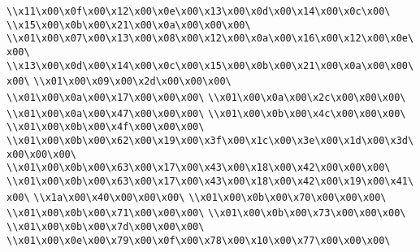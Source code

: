 \verb|\\x11\x00\x0f\x00\x12\x00\x0e\x00\x13\x00\x0d\x00\x14\x00\x0c\x00\|\newline
\verb|\\x15\x00\x0b\x00\x21\x00\x0a\x00\x00\x00\|\newline
\verb|\\x01\x00\x07\x00\x13\x00\x08\x00\x12\x00\x0a\x00\x16\x00\x12\x00\x0e\x00\|\newline
\verb|\\x13\x00\x0d\x00\x14\x00\x0c\x00\x15\x00\x0b\x00\x21\x00\x0a\x00\x00\x00\|\newline
\verb|\\x01\x00\x09\x00\x2d\x00\x00\x00\|\newline
\verb|\\x01\x00\x0a\x00\x17\x00\x00\x00\|\newline
\verb|\\x01\x00\x0a\x00\x2c\x00\x00\x00\|\newline
\verb|\\x01\x00\x0a\x00\x47\x00\x00\x00\|\newline
\verb|\\x01\x00\x0b\x00\x4c\x00\x00\x00\|\newline
\verb|\\x01\x00\x0b\x00\x4f\x00\x00\x00\|\newline
\verb|\\x01\x00\x0b\x00\x62\x00\x19\x00\x3f\x00\x1c\x00\x3e\x00\x1d\x00\x3d\x00\x00\x00\|\newline
\verb|\\x01\x00\x0b\x00\x63\x00\x17\x00\x43\x00\x18\x00\x42\x00\x00\x00\|\newline
\verb|\\x01\x00\x0b\x00\x63\x00\x17\x00\x43\x00\x18\x00\x42\x00\x19\x00\x41\x00\|\newline
\verb|\\x1a\x00\x40\x00\x00\x00\|\newline
\verb|\\x01\x00\x0b\x00\x70\x00\x00\x00\|\newline
\verb|\\x01\x00\x0b\x00\x71\x00\x00\x00\|\newline
\verb|\\x01\x00\x0b\x00\x73\x00\x00\x00\|\newline
\verb|\\x01\x00\x0b\x00\x7d\x00\x00\x00\|\newline
\verb|\\x01\x00\x0e\x00\x79\x00\x0f\x00\x78\x00\x10\x00\x77\x00\x00\x00\|\newline
